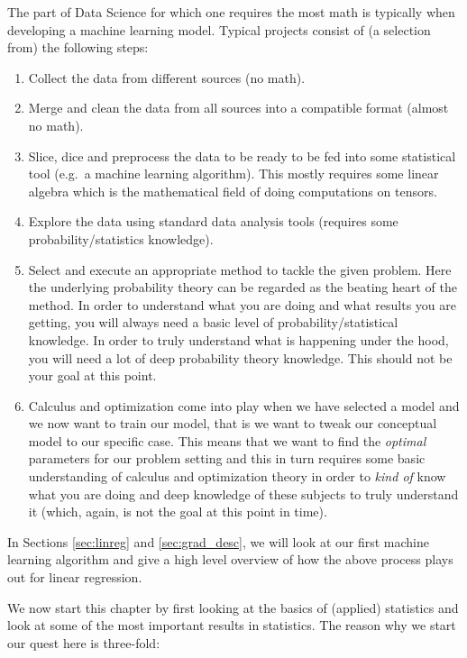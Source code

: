 \documentclass[10pt]{extarticle}
\newcommand{\<}{\langle}
\renewcommand{\>}{\rangle}
\theoremstyle{mystyle}{\newtheorem*{remark}{Remark}}
\theoremstyle{mystyle}{\newtheorem*{remarks}{Remarks}}
\theoremstyle{mystyle}{\newtheorem*{example}{Example}}
\theoremstyle{mystyle}{\newtheorem*{examples}{Examples}}
\theoremstyle{definition}{\newtheorem*{exercise}{Exercise}}
\theoremstyle{warn}
\begin{document}
The part of Data Science for which one requires the most math is typically when developing a machine learning model. Typical projects consist of (a selection from) the following steps:
\begin{enumerate}
\item Collect the data from different sources (no math).
\item Merge and clean the data from all sources into a compatible format (almost no math).
\item Slice, dice and preprocess the data to be ready to be fed into some statistical tool (e.g.~a machine learning algorithm). This mostly requires some linear algebra which is the mathematical field of doing computations on tensors.
\item Explore the data using standard data analysis tools (requires some probability/statistics knowledge).
\item Select and execute an appropriate method to tackle the given problem. Here the underlying probability theory can be regarded as the beating heart of the method. In order to understand what you are doing and what results you are getting, you will always need a basic level of probability/statistical knowledge. In order to truly understand what is happening under the hood, you will need a lot of deep probability theory knowledge. This should not be your goal at this point.
\item Calculus and optimization come into play when we have selected a model and we now want to train our model, that is we want to tweak our conceptual model to our specific case. This means that we want to find the \textit{optimal} parameters for our problem setting and this in turn requires some basic understanding of calculus and optimization theory in order to \textit{kind of} know what you are doing and deep knowledge of these subjects to truly understand it (which, again, is not the goal at this point in time).
\end{enumerate}
\begin{remark}
In Sections \ref{sec:linreg} and \ref{sec:grad_desc}, we will look at our first machine learning algorithm and give a high level overview of how the above process plays out for linear regression. 
\end{remark}
We now start this chapter by first looking at the basics of (applied) statistics and look at some of the most important results in statistics. The reason why we start our quest here is three-fold:
\end{document}
